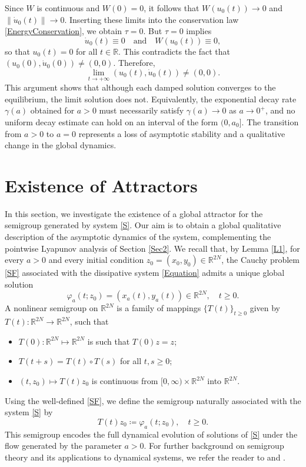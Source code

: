 \documentclass[12pt]{amsart}
\numberwithin{equation}{section}
\begin{document}
Since $W$ is continuous and $W(0)=0$, it follows that $W(u_0(t))\to 0$ and $\|\dot u_0(t)\|\to 0$. Inserting these limits into the conservation law \eqref{EnergyConservation}, we obtain $\tau=0$. But $\tau=0$ implies
$$
\dot u_0(t)\equiv 0\quad\text{and}\quad W(u_0(t))\equiv 0,
$$
so that $u_0(t)= 0$ for all $t\in\mathbb{R}$. This contradicts the fact that $(u_0(0),\dot u_0(0))\neq(0,0)$. Therefore,
$$
\lim_{t \to +\infty} (u_0(t),\dot{u}_0(t)) \neq (0,0).
$$
This argument shows that although each damped solution converges to the equilibrium, the limit solution does not. Equivalently, the exponential decay rate $\gamma(a)$ obtained for $a>0$ must necessarily satisfy $\gamma(a)\to 0$ as $a\to 0^+$, and no uniform decay estimate can hold on an interval of the form $(0,a_0]$. The transition from $a>0$ to $a=0$ represents a loss of asymptotic stability and a qualitative change in the global dynamics.


\section{Existence of Attractors}\label{Sec4}

In this section, we investigate the existence of a global attractor for the semigroup generated by system \eqref{S}. Our aim is to obtain a global qualitative description of the asymptotic dynamics of the system, complementing the pointwise Lyapunov analysis of Section \ref{Sec2}. We recall that, by Lemma \ref{L1}, for every $a>0$ and every initial condition $z_0 = (x_0,y_0)\in\mathbb{R}^{2N}$, the Cauchy problem \eqref{SF} associated with the dissipative system \eqref{Equation} admits a unique global solution
$$
\varphi_a(t;z_0) = (x_a(t),y_a(t)) \in \mathbb{R}^{2N}, \quad t\ge 0.
$$
A nonlinear semigroup on $\mathbb{R}^{2N}$ is a family of mappings $\{T(t)\}_{t\ge 0}$ given by $T(t):\mathbb{R}^{2N}\to\mathbb{R}^{2N}$, such that
\begin{itemize}
	\item[(a)] $T(0):\mathbb{R}^{2N}\mapsto\mathbb{R}^{2N}$ is such that $T(0)z=z$;
	\item[(b)] $T(t+s)=T(t)\circ T(s)$ for all $t,s\ge 0$;
	\item[(c)] $(t,z_0)\mapsto T(t)z_0$ is continuous from $[0,\infty)\times \mathbb{R}^{2N}$ into $\mathbb{R}^{2N}$. 
\end{itemize}
Using the well-defined \eqref{SF}, we define the semigroup naturally associated with the system \eqref{S} by
\begin{equation}\label{semigroup-definition}
	T(t) z_0 \coloneqq \varphi_a(t;z_0), \quad t\ge 0.
\end{equation}
This semigroup encodes the full dynamical evolution of solutions of  \eqref{S} under the flow generated by the parameter $a>0$. For further background on semigroup theory and its applications to dynamical systems, we refer the reader to \cite{Livro-Alexandre} and \cite{Hale}.
\end{document}
